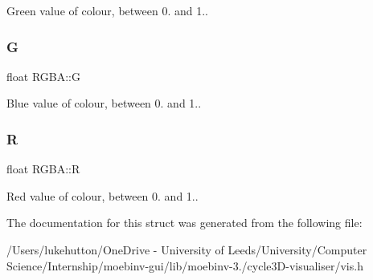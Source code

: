 Green value of colour, between 0. and 1.. \mbox{\label{struct_r_g_b_a_a54b5e1344513e48c93ad662133ac0051}} 
\subsubsection{\texorpdfstring{G}{G}}
{\footnotesize\ttfamily float R\+G\+B\+A\+::G}

Blue value of colour, between 0. and 1.. \mbox{\label{struct_r_g_b_a_ac86edc3c85a79bd5cc355d5650cb5a39}} 
\subsubsection{\texorpdfstring{R}{R}}
{\footnotesize\ttfamily float R\+G\+B\+A\+::R}

Red value of colour, between 0. and 1.. 

The documentation for this struct was generated from the following file\+:\begin{DoxyCompactItemize}
\item 
/\+Users/lukehutton/\+One\+Drive -\/ University of Leeds/\+University/\+Computer Science/\+Internship/moebinv-\/gui/lib/moebinv-\/3./cycle3\+D-\/visualiser/vis.\+h\end{DoxyCompactItemize}
